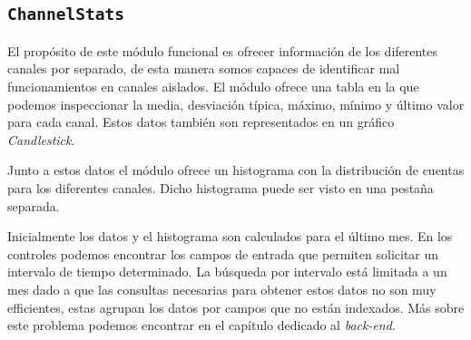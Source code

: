 	\subsection{\texttt{ChannelStats}}
		El propósito de este módulo funcional es ofrecer información de los diferentes canales por separado, de esta manera somos capaces de
		identificar mal funcionamientos en canales aislados. El módulo ofrece una tabla en la que podemos inspeccionar la media, desviación
		típica, máximo, mínimo y último valor para cada canal. Estos datos también son representados en un gráfico \emph{Candlestick}.
		\par
		Junto a estos datos el módulo ofrece un histograma con la distribución de cuentas para los diferentes canales. Dicho histograma puede
		ser visto en una pestaña separada.
		\par
		Inicialmente los datos y el histograma son calculados para el último mes. En los controles podemos encontrar los campos de entrada que
		permiten solicitar un intervalo de tiempo determinado. La búsqueda por intervalo está limitada a un mes dado a que las consultas
		necesarias para obtener estos datos no son muy efficientes, estas agrupan los datos por campos que no están indexados. Más sobre este
		problema podemos encontrar en el capítulo dedicado al \emph{back-end}.
